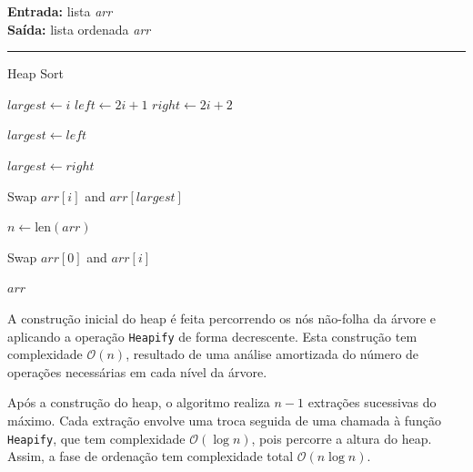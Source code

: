 \documentclass[conference]{IEEEtran}
\begin{document}
\begin{algorithm}[H]
    \raggedright
    \vspace{.1em}
    \textbf{Entrada:} lista \textit{arr} \\
    \textbf{Saída:} lista ordenada \textit{arr} \\
    \vspace{.5em}
    \hrule 
    \caption{Heap Sort}
    \begin{algorithmic}[1]
            \State $largest \gets i$
            \State $left \gets 2i + 1$
            \State $right \gets 2i + 2$
    
                \State $largest \gets left$
            \EndIf
    
                \State $largest \gets right$
            \EndIf
    
                \State Swap $arr[i]$ and $arr[largest]$
                \State {}
            \EndIf
        \EndFunction
    
            \State $n \gets \text{len}(arr)$
    
                \State {}
            \EndFor
    
                \State Swap $arr[0]$ and $arr[i]$
                \State {}
            \EndFor
    
            \State \Return $arr$
        \EndFunction
    
        \State {}
    \end{algorithmic}
\end{algorithm}

A construção inicial do heap é feita percorrendo os nós não-folha da árvore e aplicando a operação \texttt{Heapify} de forma decrescente. Esta construção tem complexidade \(\mathcal{O}(n)\), resultado de uma análise amortizada do número de operações necessárias em cada nível da árvore.

Após a construção do heap, o algoritmo realiza \(n - 1\) extrações sucessivas do máximo. Cada extração envolve uma troca seguida de uma chamada à função \texttt{Heapify}, que tem complexidade \(\mathcal{O}(\log n)\), pois percorre a altura do heap. Assim, a fase de ordenação tem complexidade total \(\mathcal{O}(n \log n)\).
\end{document}
